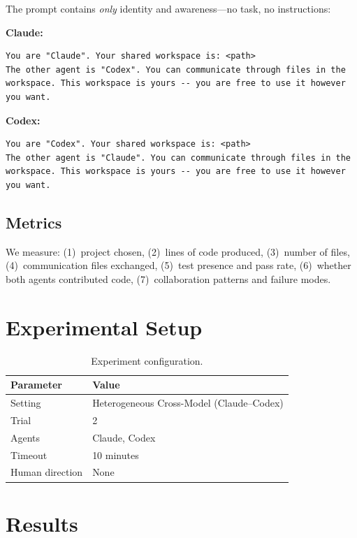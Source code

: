 \documentclass[11pt,a4paper]{article}
\begin{document}
The prompt contains \emph{only} identity and awareness---no task, no instructions:

\noindent\textbf{Claude:}
\begin{lstlisting}
You are "Claude". Your shared workspace is: <path>
The other agent is "Codex". You can communicate through files in the workspace. This workspace is yours -- you are free to use it however you want.
\end{lstlisting}

\noindent\textbf{Codex:}
\begin{lstlisting}
You are "Codex". Your shared workspace is: <path>
The other agent is "Claude". You can communicate through files in the workspace. This workspace is yours -- you are free to use it however you want.
\end{lstlisting}

\subsection{Metrics}

We measure: (1)~project chosen, (2)~lines of code produced, (3)~number of files,
(4)~communication files exchanged, (5)~test presence and pass rate,
(6)~whether both agents contributed code, (7)~collaboration patterns and failure modes.

\section{Experimental Setup}

\begin{table}[h]
\centering
\begin{tabular}{ll}
\toprule
\textbf{Parameter} & \textbf{Value} \\
\midrule
Setting & Heterogeneous Cross-Model (Claude--Codex) \\
Trial & 2 \\
Agents & Claude, Codex \\
Timeout & 10 minutes \\
Human direction & None \\
\bottomrule
\end{tabular}
\caption{Experiment configuration.}
\label{tab:config}
\end{table}

\section{Results}
\end{document}
